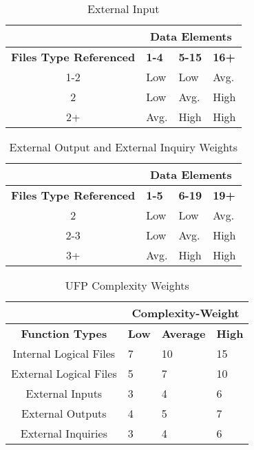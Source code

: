 \begin{table}[!htbp]
\caption{External Input}
\begin{tabularx}{\textwidth}{|c|X|X|X|}
\hline
& \multicolumn{3}{|c|}{\textbf{Data Elements}}
\\ \hline
\textbf{\textbf{Files Type Referenced }}      & \textbf{1-4} & \textbf{5-15}   & \textbf{16+}
\\ \hline
1-2									   & Low           & Low              & Avg.
\\ \hline
2									   & Low           & Avg.             & High
\\ \hline
2+									   & Avg.          & High             & High
\\ \hline


\end{tabularx}
\end{table}

\begin{table}[!htbp]
\caption{External Output and External Inquiry Weights}
\begin{tabularx}{\textwidth}{|c|X|X|X|}
\hline
& \multicolumn{3}{|c|}{\textbf{Data Elements}}
\\ \hline
\textbf{\textbf{Files Type Referenced }}      & \textbf{1-5} & \textbf{6-19}   & \textbf{19+}
\\ \hline
2									   & Low           & Low              & Avg.
\\ \hline
2-3									   & Low           & Avg.             & High
\\ \hline
3+  								   & Avg.          & High             & High
\\ \hline


\end{tabularx}
\end{table}

\begin{table}[!htbp]
\caption{UFP Complexity Weights}
\begin{tabularx}{\textwidth}{|c|X|X|X|}
\hline
& \multicolumn{3}{|c|}{\textbf{Complexity-Weight}}
\\ \hline
\textbf{Function Types}   & \textbf{Low} & \textbf{Average}   & \textbf{High}
\\ \hline
Internal Logical Files 			   & 7          & 10             & 15
\\ \hline
External Logical Files             & 5          & 7				 & 10
\\ \hline
External Inputs             	   & 3          & 4				 & 6
\\ \hline
External Outputs                   & 4          & 5				 & 7
\\ \hline
External Inquiries                 & 3          & 4				 & 6
\\ \hline
\end{tabularx}
\end{table}


